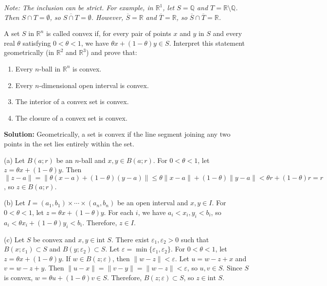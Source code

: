 \textit{Note: The inclusion can be strict. For example, in $\mathbb{R}^1$, let $S = \mathbb{Q}$ and $T = \mathbb{R} \setminus \mathbb{Q}$. Then $S \cap T = \emptyset$, so $\overline{S \cap T} = \emptyset$. However, $\overline{S} = \mathbb{R}$ and $\overline{T} = \mathbb{R}$, so $\overline{S} \cap \overline{T} = \mathbb{R}$.}

\begin{problembox}
A set \( S \) in \( \mathbb{R}^n \) is called convex if, for every pair of points \( x \) and \( y \) in \( S \) and every real \( \theta \) satisfying \( 0 < \theta < 1 \), we have \( \theta x + (1 - \theta)y \in S \). Interpret this statement geometrically (in \( \mathbb{R}^2 \) and \( \mathbb{R}^3 \)) and prove that:
\begin{enumerate}[label=\alph*)]
\item Every \( n \)-ball in \( \mathbb{R}^n \) is convex.
\item Every \( n \)-dimensional open interval is convex.
\item The interior of a convex set is convex.
\item The closure of a convex set is convex.
\end{enumerate}
\end{problembox}

\textbf{Solution:} Geometrically, a set is convex if the line segment joining any two points in the set lies entirely within the set.

(a) Let $B(a;r)$ be an $n$-ball and $x, y \in B(a;r)$. For $0 < \theta < 1$, let $z = \theta x + (1-\theta)y$. Then $\|z-a\| = \|\theta(x-a) + (1-\theta)(y-a)\| \leq \theta\|x-a\| + (1-\theta)\|y-a\| < \theta r + (1-\theta)r = r$, so $z \in B(a;r)$.

(b) Let $I = (a_1,b_1) \times \cdots \times (a_n,b_n)$ be an open interval and $x, y \in I$. For $0 < \theta < 1$, let $z = \theta x + (1-\theta)y$. For each $i$, we have $a_i < x_i, y_i < b_i$, so $a_i < \theta x_i + (1-\theta)y_i < b_i$. Therefore, $z \in I$.

(c) Let $S$ be convex and $x, y \in \text{int } S$. There exist $\varepsilon_1, \varepsilon_2 > 0$ such that $B(x;\varepsilon_1) \subset S$ and $B(y;\varepsilon_2) \subset S$. Let $\varepsilon = \min\{\varepsilon_1, \varepsilon_2\}$. For $0 < \theta < 1$, let $z = \theta x + (1-\theta)y$. If $w \in B(z;\varepsilon)$, then $\|w-z\| < \varepsilon$. Let $u = w - z + x$ and $v = w - z + y$. Then $\|u-x\| = \|v-y\| = \|w-z\| < \varepsilon$, so $u, v \in S$. Since $S$ is convex, $w = \theta u + (1-\theta)v \in S$. Therefore, $B(z;\varepsilon) \subset S$, so $z \in \text{int } S$.

